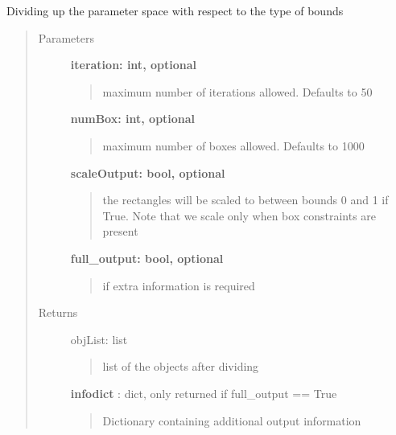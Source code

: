 \documentclass[letterpaper,10pt,english]{sphinxmanual}
\begin{document}
\begin{fulllineitems}
\begin{fulllineitems}
Dividing up the parameter space with respect to the type of bounds
\begin{quote}\begin{description}
\item[{Parameters}] \leavevmode
\textbf{iteration: int, optional}
\begin{quote}

maximum number of iterations allowed. Defaults to 50
\end{quote}

\textbf{numBox: int, optional}
\begin{quote}

maximum number of boxes allowed. Defaults to 1000
\end{quote}

\textbf{scaleOutput: bool, optional}
\begin{quote}

the rectangles will be scaled to between bounds 0 and 1 if True.  
Note that we scale only when box constraints are present
\end{quote}

\textbf{full\_output: bool, optional}
\begin{quote}

if extra information is required
\end{quote}

\item[{Returns}] \leavevmode
objList: list
\begin{quote}

list of the objects after dividing
\end{quote}

\textbf{infodict} : dict, only returned if full\_output == True
\begin{quote}

Dictionary containing additional output information


\end{quote}
\end{description}
\end{quote}
\end{fulllineitems}
\end{fulllineitems}
\end{document}
